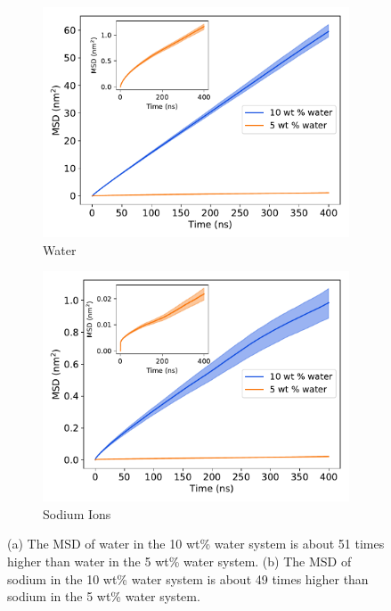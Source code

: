 \documentclass[journal=jpcbfk,manuscript=article]{achemso}
\begin{document}
  \begin{figure}[!htb]
  \centering
  \begin{subfigure}{0.45\textwidth}
  \includegraphics[width=\textwidth]{water_msd_comparison.pdf}
  \caption{Water}\label{fig:water_msd_comparison}
  \end{subfigure}
  \begin{subfigure}{0.45\textwidth}
  \includegraphics[width=\textwidth]{na_msd_comparison.pdf}
  \caption{Sodium Ions}\label{fig:na_msd_comparison}
  \end{subfigure}
  \caption{(a) The MSD of water in the 10 wt\% water system is about 51 times
  higher than water in the 5 wt\% water system. (b) The MSD of sodium in the
  10 wt\% water system is about 49 times higher than sodium in the 5 wt\% 
  water system.}\label{fig:msd_comparison}
  \end{figure}
  
\end{document}
